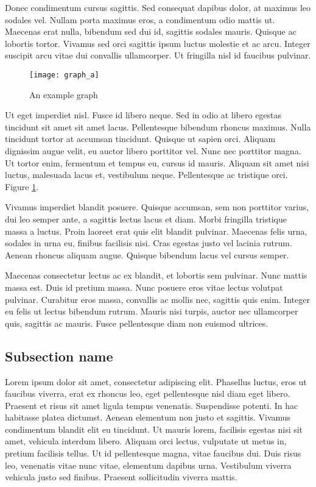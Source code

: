 Donec condimentum cursus sagittis. Sed consequat dapibus dolor, at maximus leo sodales vel. Nullam porta maximus eros, a condimentum odio mattis ut. Maecenas erat nulla, bibendum sed dui id, sagittis sodales mauris. Quisque ac lobortis tortor. Vivamus sed orci sagittis ipsum luctus molestie et ac arcu. Integer suscipit arcu vitae dui convallis ullamcorper. Ut fringilla nisl id faucibus pulvinar.
\begin{figure}[ht]
\centering
\texttt{[image: graph\_a]}
\caption{An example graph}
\label{fig:x cubed graph}
\end{figure}

Ut eget imperdiet nisl. Fusce id libero neque. Sed in odio at libero egestas tincidunt sit amet sit amet lacus. Pellentesque bibendum rhoncus maximus. Nulla tincidunt tortor at accumsan tincidunt. Quisque ut sapien orci. Aliquam dignissim augue velit, eu auctor libero porttitor vel. Nunc nec porttitor magna. Ut tortor enim, fermentum et tempus eu, cursus id mauris. Aliquam sit amet nisi luctus, malesuada lacus et, vestibulum neque. Pellentesque ac tristique orci. Figure \ref{fig:x cubed graph}.

Vivamus imperdiet blandit posuere. Quisque accumsan, sem non porttitor varius, dui leo semper ante, a sagittis lectus lacus et diam. Morbi fringilla tristique massa a luctus. Proin laoreet erat quis elit blandit pulvinar. Maecenas felis urna, sodales in urna eu, finibus facilisis nisi. Cras egestas justo vel lacinia rutrum. Aenean rhoncus aliquam augue. Quisque bibendum lacus vel cursus semper.

Maecenas consectetur lectus ac ex blandit, et lobortis sem pulvinar. Nunc mattis massa est. Duis id pretium massa. Nunc posuere eros vitae lectus volutpat pulvinar. Curabitur eros massa, convallis ac mollis nec, sagittis quis enim. Integer eu felis ut lectus bibendum rutrum. Mauris nisi turpis, auctor nec ullamcorper quis, sagittis ac mauris. Fusce pellentesque diam non euismod ultrices. 

\subsection{Subsection name}
Lorem ipsum dolor sit amet, consectetur adipiscing elit. Phasellus luctus, eros ut faucibus viverra, erat ex rhoncus leo, eget pellentesque nisl diam eget libero. Praesent et risus sit amet ligula tempus venenatis. Suspendisse potenti. In hac habitasse platea dictumst. Aenean elementum non justo et sagittis. Vivamus condimentum blandit elit eu tincidunt. Ut mauris lorem, facilisis egestas nisi sit amet, vehicula interdum libero. Aliquam orci lectus, vulputate ut metus in, pretium facilisis tellus. Ut id pellentesque magna, vitae faucibus dui. Duis risus leo, venenatis vitae nunc vitae, elementum dapibus urna. Vestibulum viverra vehicula justo sed finibus. Praesent sollicitudin viverra mattis.

